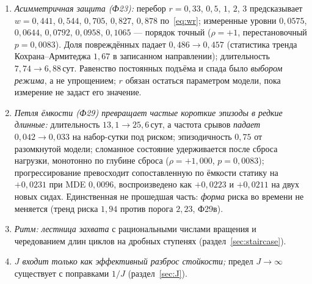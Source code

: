 \documentclass[11pt,a4paper]{article}
\theoremstyle{remark}
\begin{document}
\begin{enumerate}[leftmargin=1.2em]
$p=9{,}3\cdot10^{-13}$ в обратном, а перестановка меток калибрует критерий на $0{,}049$;
все четыре части прошли, повторено на 2000 наборах. Без
подгонки: потолок $\times3$ измерен, $\tau_p$ перебиралась; ускорение первой ступени
даёт от $-1$ до $-5$\,\% против $-52$\,\% у усиления, как и предсказано. Механизм:
прайминг поднимает \emph{верх} окна, а не ускоряет починку.
\item \emph{Асимметричная защита (Ф23):} перебор $r=0{,}33$, $0{,}5$, $1$, $2$, $3$
предсказывает $w=0{,}441$, $0{,}544$, $0{,}705$, $0{,}827$, $0{,}878$
по~\eqref{eq:wr}; измеренные уровни $0{,}0575$, $0{,}0644$, $0{,}0792$, $0{,}0958$,
$0{,}1065$ --- порядок точный ($\rho=+1$,
перестановочный $p=0{,}0083$). Доля повреждённых падает $0{,}486\to0{,}457$ (статистика тренда
Кохрана--Армитеджа $1{,}67$ в записанном направлении); длительность $7{,}74\to6{,}88$\,сут. Равенство постоянных подъёма и
спада было \emph{выбором режима}, а не упрощением; $r$ обязан остаться параметром
модели, пока измерение не задаст его значение.
\item \emph{Петля ёмкости (Ф29) превращает частые короткие эпизоды в редкие длинные:}
длительность $13{,}1\to25{,}6$\,сут, а частота срывов \emph{падает}
$0{,}042\to0{,}033$ на набор-сутки под риском; эпизодичность $0{,}75$ от разомкнутой
модели; сломанное состояние удерживается после сброса нагрузки, монотонно по глубине
сброса ($\rho=+1{,}000$, $p=0{,}0083$); прогрессирование превосходит сопоставленную по
ёмкости статику на $+0{,}0231$ при MDE $0{,}0096$, воспроизведено как $+0{,}0223$ и
$+0{,}0211$ на двух новых сидах. Единственная не прошедшая часть: \emph{форма} риска
во времени не меняется (тренд риска $1{,}94$ против порога $2{,}23$, Ф29в).
\item \emph{Ритм: лестница захвата} с рациональными числами вращения и чередованием
длин циклов на дробных ступенях (раздел~\ref{sec:staircase}).
\item \emph{$J$ входит только как эффективный разброс стойкости;} предел $J\to\infty$
существует с поправками $1/J$ (раздел~\ref{sec:J}).
\end{enumerate}
\end{document}
